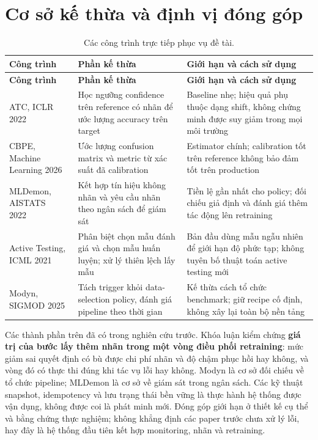 \section{Cơ sở kế thừa và định vị đóng góp}
\begin{xltabular}{\linewidth}{@{}L{3.1cm} Y Y@{}}
\caption{Các công trình trực tiếp phục vụ đề tài.}\label{tab:related}\\
\toprule
\textbf{Công trình} & \textbf{Phần kế thừa} & \textbf{Giới hạn và cách sử dụng} \\
\midrule\endfirsthead
\toprule\textbf{Công trình} & \textbf{Phần kế thừa} & \textbf{Giới hạn và cách sử dụng} \\
\midrule\endhead
ATC, ICLR 2022~\cite{atc} & Học ngưỡng confidence trên reference có nhãn để ước lượng accuracy trên target & Baseline nhẹ; hiệu quả phụ thuộc dạng shift, không chứng minh được suy giảm trong mọi môi trường \\
CBPE, Machine Learning 2026~\cite{cbpe} & Ước lượng confusion matrix và metric từ xác suất đã calibration & Estimator chính; calibration tốt trên reference không bảo đảm tốt trên production \\
MLDemon, AISTATS 2022~\cite{mldemon} & Kết hợp tín hiệu không nhãn và yêu cầu nhãn theo ngân sách để giám sát & Tiền lệ gần nhất cho policy; đối chiếu giả định và đánh giá thêm tác động lên retraining \\
Active Testing, ICML 2021~\cite{active_testing} & Phân biệt chọn mẫu đánh giá và chọn mẫu huấn luyện; xử lý thiên lệch lấy mẫu & Bản đầu dùng mẫu ngẫu nhiên để giới hạn độ phức tạp; không tuyên bố thuật toán active testing mới \\
Modyn, SIGMOD 2025~\cite{modyn} & Tách trigger khỏi data-selection policy, đánh giá pipeline theo thời gian & Kế thừa cách tổ chức benchmark; giữ recipe cố định, không xây lại toàn bộ nền tảng \\
\bottomrule
\end{xltabular}

Các thành phần trên đã có trong nghiên cứu trước. Khóa luận kiểm chứng \textbf{giá trị của bước lấy thêm nhãn trong một vòng điều phối retraining}: mức giảm sai quyết định có bù được chi phí nhãn và độ chậm phục hồi hay không, và vòng đó có thực thi đúng khi tác vụ lỗi hay không. Modyn là cơ sở đối chiếu về tổ chức pipeline; MLDemon là cơ sở về giám sát trong ngân sách. Các kỹ thuật snapshot, idempotency và lưu trạng thái bền vững là thực hành hệ thống được vận dụng, không được coi là phát minh mới. Đóng góp giới hạn ở thiết kế cụ thể và bằng chứng thực nghiệm; không khẳng định các paper trước chưa xử lý lỗi, hay đây là hệ thống đầu tiên kết hợp monitoring, nhãn và retraining.
